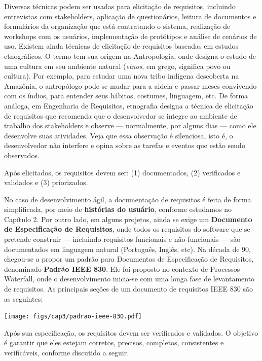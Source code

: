 \documentclass[
  11pt,
  twoside]{book}
\let\origfigure\figure
\let\endorigfigure\endfigure
\renewenvironment{figure}[1][2] {
    \expandafter\origfigure\expandafter[!h]
} {
    \endorigfigure
}
\begin{document}
Diversas técnicas podem ser usadas para elicitação de requisitos,
incluindo entrevistas com stakeholders, aplicação de questionários,
leitura de documentos e formulários da organização que está contratando
o sistema, realização de workshops com os usuários, implementação de
protótipos e análise de cenários de uso. Existem ainda técnicas de
elicitação de requisitos baseadas em estudos etnográficos. O termo tem
sua origem na Antropologia, onde designa o estudo de uma cultura em seu
ambiente natural (\emph{etnos}, em grego, significa povo ou cultura).
Por exemplo, para estudar uma nova tribo indígena descoberta na
Amazônia, o antropólogo pode se mudar para a aldeia e passar meses
convivendo com os índios, para entender seus hábitos, costumes,
linguagem, etc. De forma análoga, em Engenharia de Requisitos,
etnografia designa a técnica de elicitação de requisitos que recomenda
que o desenvolvedor se integre ao ambiente de trabalho dos stakeholders
e observe --- normalmente, por alguns dias --- como ele desenvolve suas
atividades. Veja que essa observação é silenciosa, isto é, o
desenvolvedor não interfere e opina sobre as tarefas e eventos que estão
sendo observados.

Após elicitados, os requisitos devem ser: (1) documentados, (2)
verificados e validados e (3) priorizados.

 No caso de desenvolvimento
ágil, a documentação de requisitos é feita de forma simplificada, por
meio de \textbf{histórias do usuário}, conforme estudamos no Capítulo 2.
Por outro lado, em alguns projetos, ainda se exige um \textbf{Documento
de Especificação de Requisitos}, onde todos os requisitos do software
que se pretende construir --- incluindo requisitos funcionais e
não-funcionais --- são documentados em linguagem natural (Português,
Inglês, etc). Na década de 90, chegou-se a propor um padrão para
Documentos de Especificação de Requisitos, denominado \textbf{Padrão
IEEE 830}. Ele foi proposto no contexto de Processos Waterfall, onde o
desenvolvimento inicia-se com uma longa fase de levantamento de
requisitos. As principais seções de um documento de requisitos IEEE 830
são as seguintes:

\begin{figure}
\centering
\texttt{[image: figs/cap3/padrao-ieee-830.pdf]}
\caption{Documento de Requisitos no Padrão IEEE 830}
\end{figure}

 Após sua especificação, os requisitos
devem ser verificados e validados. O objetivo é garantir que eles
estejam corretos, precisos, completos, consistentes e verificáveis,
conforme discutido a seguir.
\end{document}
